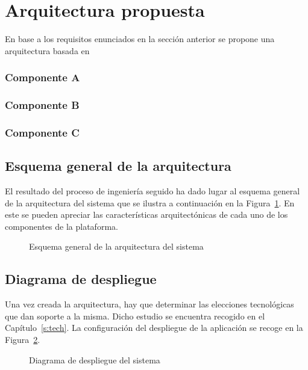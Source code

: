 \newpage
\section{Arquitectura propuesta}
\label{s:dev:arch}
En base a los requisitos enunciados en la sección anterior se propone una arquitectura basada en 

\subsubsection*{Componente A}


\subsubsection*{Componente B}


\subsubsection*{Componente C}



\subsection{Esquema general de la arquitectura}
El resultado del proceso de ingeniería seguido ha dado lugar al esquema general de la arquitectura del sistema que se ilustra a continuación en la Figura~\ref{f:dev:arch}. En este se pueden apreciar las características arquitectónicas de cada uno de los componentes de la plataforma.

\begin{figure}[h!]
\centering
\caption{Esquema general de la arquitectura del sistema}
\label{f:dev:arch}
\end{figure}


\subsection{Diagrama de despliegue}
Una vez creada la arquitectura, hay que determinar las elecciones tecnológicas que dan soporte a la misma. Dicho estudio se encuentra recogido en el Capítulo~\ref{s:tech}. La configuración del despliegue de la aplicación se recoge en la Figura~\ref{f:dev:arch-deploy}.

\begin{figure}[h!]
\centering
\caption{Diagrama de despliegue del sistema}
\label{f:dev:arch-deploy}
\end{figure}


